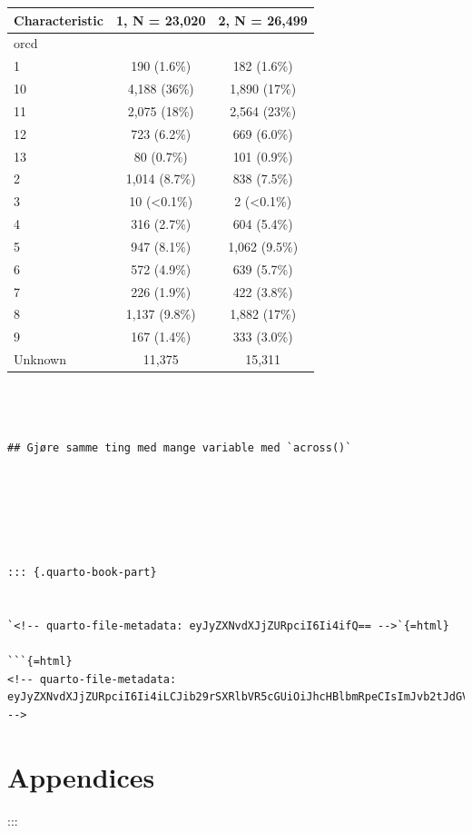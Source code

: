 \documentclass[
  letterpaper,
  DIV=11,
  numbers=noendperiod]{scrreprt}
\theoremstyle{definition}
\theoremstyle{remark}
\begin{document}
\begin{longtable}[]{@{}lcc@{}}
\toprule()
\textbf{Characteristic} & \textbf{1}, N = 23,020 & \textbf{2}, N =
26,499 \\
\midrule()
\endhead
orcd & & \\
1 & 190 (1.6\%) & 182 (1.6\%) \\
10 & 4,188 (36\%) & 1,890 (17\%) \\
11 & 2,075 (18\%) & 2,564 (23\%) \\
12 & 723 (6.2\%) & 669 (6.0\%) \\
13 & 80 (0.7\%) & 101 (0.9\%) \\
2 & 1,014 (8.7\%) & 838 (7.5\%) \\
3 & 10 (\textless0.1\%) & 2 (\textless0.1\%) \\
4 & 316 (2.7\%) & 604 (5.4\%) \\
5 & 947 (8.1\%) & 1,062 (9.5\%) \\
6 & 572 (4.9\%) & 639 (5.7\%) \\
7 & 226 (1.9\%) & 422 (3.8\%) \\
8 & 1,137 (9.8\%) & 1,882 (17\%) \\
9 & 167 (1.4\%) & 333 (3.0\%) \\
Unknown & 11,375 & 15,311 \\
\bottomrule()
\end{longtable}

\begin{verbatim}



## Gjøre samme ting med mange variable med `across()`






::: {.quarto-book-part}


`<!-- quarto-file-metadata: eyJyZXNvdXJjZURpciI6Ii4ifQ== -->`{=html}

```{=html}
<!-- quarto-file-metadata: eyJyZXNvdXJjZURpciI6Ii4iLCJib29rSXRlbVR5cGUiOiJhcHBlbmRpeCIsImJvb2tJdGVtTnVtYmVyIjpudWxsLCJib29rSXRlbURlcHRoIjowfQ== -->
\end{verbatim}

\hypertarget{appendices}{%
\chapter*{Appendices}\label{appendices}}


:::
\end{document}
